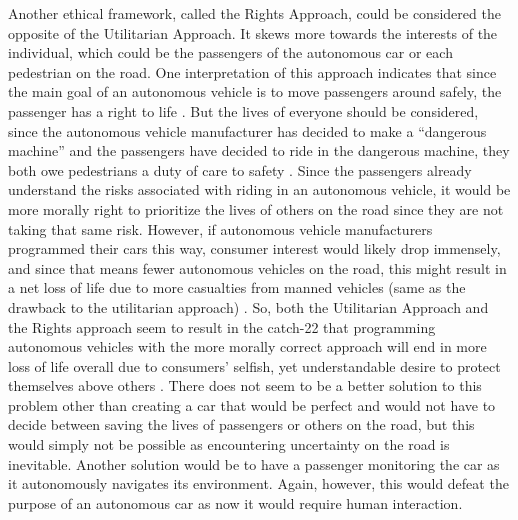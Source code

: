 \documentclass[10pt,twocolumn]{article}
\begin{document}
Another ethical framework, called the Rights Approach, could be considered the opposite of the Utilitarian Approach. It skews more towards the interests of the individual, which could be the passengers of the autonomous car or each pedestrian on the road. One interpretation of this approach indicates that since the main goal of an autonomous vehicle is to move passengers around safely, the passenger has a right to life  \cite{AutonomousAccidents}. But the lives of everyone should be considered, since the autonomous vehicle manufacturer has decided to make a “dangerous machine” and the passengers have decided to ride in the dangerous machine, they both owe pedestrians a duty of care to safety  \cite{AutonomousAccidents}. Since the passengers already understand the risks associated with riding in an autonomous vehicle, it would be more morally right to prioritize the lives of others on the road since they are not taking that same risk. However, if autonomous vehicle manufacturers programmed their cars this way, consumer interest would likely drop immensely, and since that means fewer autonomous vehicles on the road, this might result in a net loss of life due to more casualties from manned vehicles (same as the drawback to the utilitarian approach)  \cite{AutonomousAccidents}. So, both the Utilitarian Approach and the Rights approach seem to result in the catch-22 that programming autonomous vehicles with the more morally correct approach will end in more loss of life overall due to consumers’ selfish, yet understandable desire to protect themselves above others  \cite{AutonomousAccidents}. There does not seem to be a better solution to this problem other than creating a car that would be perfect and would not have to decide between saving the lives of passengers or others on the road, but this would simply not be possible as encountering uncertainty on the road is inevitable. Another solution would be to have a passenger monitoring the car as it autonomously navigates its environment. Again, however, this would defeat the purpose of an autonomous car as now it would require human interaction.
\end{document}
